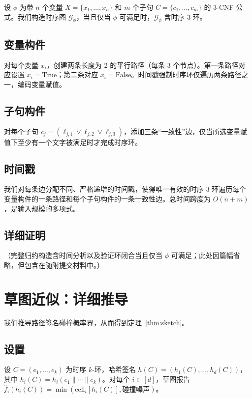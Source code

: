\documentclass[journal,onecolumn]{IEEEtran}
\newcommand{\G}{\mathcal{G}}
\begin{document}
设 $\phi$ 为带 $n$ 个变量 $X = \{x_1, \ldots, x_n\}$ 和 $m$ 个子句 $C = \{c_1, \ldots, c_m\}$ 的 3-CNF 公式。我们构造时序图 $\G_\phi$，当且仅当 $\phi$ 可满足时，$\G_\phi$ 含时序 3-环。

\subsection{变量构件}

对每个变量 $x_i$，创建两条长度为 2 的平行路径（每条 3 个节点）。第一条路径对应设置 $x_i = \mathrm{True}$；第二条对应 $x_i = \mathrm{False}$。时间戳强制时序环仅遍历两条路径之一，编码变量赋值。

\subsection{子句构件}

对每个子句 $c_j = (\ell_{j,1} \lor \ell_{j,2} \lor \ell_{j,3})$，添加三条``一致性''边，仅当所选变量赋值下至少有一个文字被满足时才完成时序环。

\subsection{时间戳}

我们对每条边分配不同、严格递增的时间戳，使得唯一有效的时序 3-环遍历每个变量构件的一条路径和每个子句构件的一条一致性边。总时间跨度为 $O(n+m)$，是输入规模的多项式。

\subsection{详细证明}

（完整归约构造含时间分析以及验证环闭合当且仅当 $\phi$ 可满足；此处因篇幅省略，但包含在随附提交材料中。）

\section{草图近似：详细推导}
\label{sec:appx-sketch}

我们推导路径签名碰撞概率界，从而得到定理~\ref{thm:sketch}。

\subsection{设置}

设 $C = (e_1, \ldots, e_k)$ 为时序 $k$-环，哈希签名 $h(C) = (h_1(C), \ldots, h_d(C))$，其中 $h_i(C) = h_i(e_1 \| \cdots \| e_k)$。对每个 $i \in [d]$，草图报告
$\hat{f}_i(h_i(C)) = \min(\mathrm{cell}_i[h_i(C)], \mathrm{碰撞噪声})$。
\end{document}
